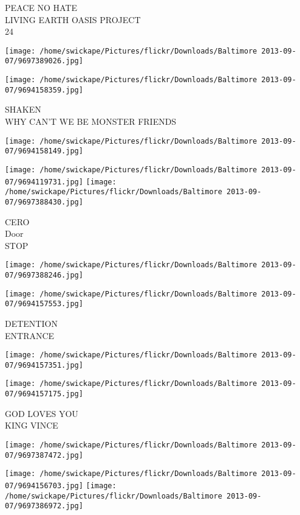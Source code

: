 \documentclass[10pt,letterpaper]{article}
\begin{document}
PEACE NO HATE\\
LIVING EARTH OASIS PROJECT\\
24
\pagebreak

\texttt{[image: /home/swickape/Pictures/flickr/Downloads/Baltimore 2013-09-07/9697389026.jpg]}

\vspace{0.25in}
\texttt{[image: /home/swickape/Pictures/flickr/Downloads/Baltimore 2013-09-07/9694158359.jpg]}

SHAKEN\\
WHY CAN'T WE BE MONSTER FRIENDS
\pagebreak

\texttt{[image: /home/swickape/Pictures/flickr/Downloads/Baltimore 2013-09-07/9694158149.jpg]}

\vspace{0.25in}
\texttt{[image: /home/swickape/Pictures/flickr/Downloads/Baltimore 2013-09-07/9694119731.jpg]}
\texttt{[image: /home/swickape/Pictures/flickr/Downloads/Baltimore 2013-09-07/9697388430.jpg]}

CERO\\
Door\\
STOP
\pagebreak

\texttt{[image: /home/swickape/Pictures/flickr/Downloads/Baltimore 2013-09-07/9697388246.jpg]}

\vspace{0.25in}
\texttt{[image: /home/swickape/Pictures/flickr/Downloads/Baltimore 2013-09-07/9694157553.jpg]}

DETENTION\\
ENTRANCE
\pagebreak

\texttt{[image: /home/swickape/Pictures/flickr/Downloads/Baltimore 2013-09-07/9694157351.jpg]}

\vspace{0.25in}
\texttt{[image: /home/swickape/Pictures/flickr/Downloads/Baltimore 2013-09-07/9694157175.jpg]}

GOD LOVES YOU\\
KING VINCE
\pagebreak

\texttt{[image: /home/swickape/Pictures/flickr/Downloads/Baltimore 2013-09-07/9697387472.jpg]}

\vspace{0.25in}
\texttt{[image: /home/swickape/Pictures/flickr/Downloads/Baltimore 2013-09-07/9694156703.jpg]}
\texttt{[image: /home/swickape/Pictures/flickr/Downloads/Baltimore 2013-09-07/9697386972.jpg]}
\end{document}
